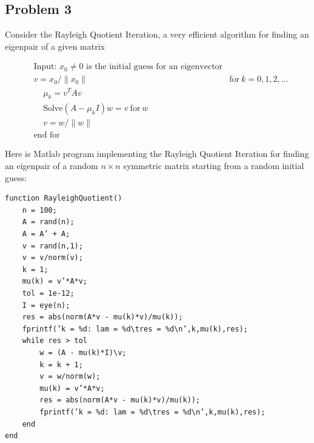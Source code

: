 \documentclass[12pt]{report}
\begin{document}
\begin{problem}%
\subsection*{Problem 3}

Consider the Rayleigh Quotient Iteration, a very efficient algorithm for finding an eigenpair of a given matrix

\begin{align*}
    &\text{Input: $x_0 \neq 0$ is the initial guess for an eigenvector}\\
    &v = x_0 / \|x_0\|
    &\text{for} ~ k = 0, 1, 2, \dots\\
    &~~~~~\mu_k = v^T A v\\
    &~~~~~ \text{Solve} (A - \mu_k I)w = v ~\text{for}~ w\\
    &~~~~~ v = w / \|w\|\\
    &\text{end for}
\end{align*}

\noindent Here is Matlab program implementing the Rayleigh Quotient Iteration for finding an eigenpair of a random $n \times n$ symmetric matrix starting from a random initial guess:

\begin{verbatim}
function RayleighQuotient()
    n = 100;
    A = rand(n);
    A = A’ + A;
    v = rand(n,1);
    v = v/norm(v);
    k = 1;
    mu(k) = v’*A*v;
    tol = 1e-12;
    I = eye(n);
    res = abs(norm(A*v - mu(k)*v)/mu(k));
    fprintf(’k = %d: lam = %d\tres = %d\n’,k,mu(k),res);
    while res > tol
        w = (A - mu(k)*I)\v;
        k = k + 1;
        v = w/norm(w);
        mu(k) = v’*A*v;
        res = abs(norm(A*v - mu(k)*v)/mu(k));
        fprintf(’k = %d: lam = %d\tres = %d\n’,k,mu(k),res);
    end
end
\end{verbatim}


\end{problem}
\end{document}
